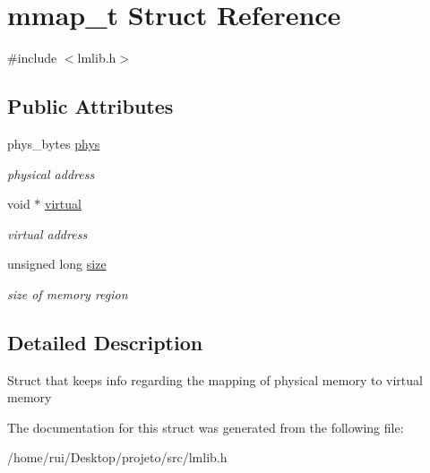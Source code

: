 \hypertarget{structmmap__t}{}\section{mmap\+\_\+t Struct Reference}
\label{structmmap__t}


{\ttfamily \#include $<$lmlib.\+h$>$}

\subsection*{Public Attributes}
\begin{DoxyCompactItemize}
\item 
phys\+\_\+bytes \hyperlink{group__lmlib_gaa6ac1ee0e0fadea4a4f85b48c8359ae4}{phys}
\begin{DoxyCompactList}\small\item\em physical address \end{DoxyCompactList}\item 
void $\ast$ \hyperlink{group__lmlib_ga4de93144fb3ffbceb9bd1f3009d6d98c}{virtual}
\begin{DoxyCompactList}\small\item\em virtual address \end{DoxyCompactList}\item 
unsigned long \hyperlink{group__lmlib_gaf1cdc5384a402fddf33f400a5e1e5e45}{size}
\begin{DoxyCompactList}\small\item\em size of memory region \end{DoxyCompactList}\end{DoxyCompactItemize}


\subsection{Detailed Description}
Struct that keeps info regarding the mapping of physical memory to virtual memory 

The documentation for this struct was generated from the following file\+:\begin{DoxyCompactItemize}
\item 
/home/rui/\+Desktop/projeto/src/lmlib.\+h\end{DoxyCompactItemize}
